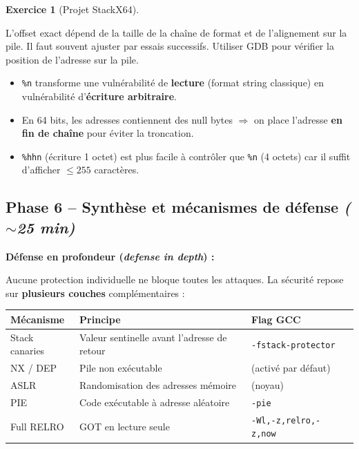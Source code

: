 \documentclass[a4paper,11pt]{article}
\theoremstyle{plain}
\theoremstyle{definition}
\newtheorem{exercice}{Exercice}
\begin{document}
\begin{exercice}[Projet StackX64]
\begin{correction}
\begin{attention}
L'offset exact dépend de la taille de la chaîne de format et de l'alignement sur la pile. Il faut souvent ajuster par essais successifs. Utiliser GDB pour vérifier la position de l'adresse sur la pile.
\end{attention}

\begin{pointcle}
\begin{itemize}
    \item \texttt{\%n} transforme une vulnérabilité de \textbf{lecture} (format string classique) en vulnérabilité d'\textbf{écriture arbitraire}.
    \item En 64 bits, les adresses contiennent des null bytes $\Rightarrow$ on place l'adresse \textbf{en fin de chaîne} pour éviter la troncation.
    \item \texttt{\%hhn} (écriture 1 octet) est plus facile à contrôler que \texttt{\%n} (4 octets) car il suffit d'afficher $\leq 255$ caractères.
\end{itemize}
\end{pointcle}

\end{correction}



\subsection*{Phase 6 -- Synthèse et mécanismes de défense \hfill\normalfont\textit{($\sim$25 min)}}

\begin{rappel}
\textbf{Défense en profondeur (\textit{defense in depth}) :}

Aucune protection individuelle ne bloque toutes les attaques. La sécurité repose sur \textbf{plusieurs couches} complémentaires :

\begin{center}
\begin{tabular}{llll}
\toprule
\textbf{Mécanisme} & \textbf{Principe} & \textbf{Flag GCC} \\
\midrule
Stack canaries & Valeur sentinelle avant l'adresse de retour & \texttt{-fstack-protector} \\
NX / DEP & Pile non exécutable & (activé par défaut) \\
ASLR & Randomisation des adresses mémoire & (noyau) \\
PIE & Code exécutable à adresse aléatoire & \texttt{-pie} \\
Full RELRO & GOT en lecture seule & \texttt{-Wl,-z,relro,-z,now} \\
\bottomrule
\end{tabular}
\end{center}
\end{rappel}


\end{exercice}
\end{document}
